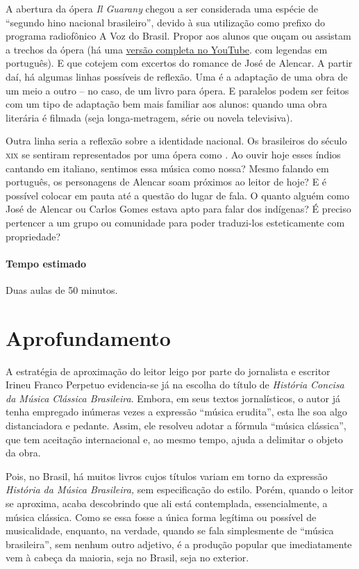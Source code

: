 \documentclass[11pt]{extarticle}
\begin{document}
A abertura da ópera \textit{Il Guarany} chegou a ser considerada uma espécie de
“segundo hino nacional brasileiro”, devido à sua utilização como prefixo do
programa radiofônico A Voz do Brasil. Propor aos alunos que ouçam ou assistam a
trechos da ópera  (há uma 
\href{https://www.youtube.com/watch?v=XTIpAyXyvFA&t=3746s}{versão completa no YouTube}. 
com legendas em
português).
E que cotejem
com excertos do romance de José de Alencar. A partir daí, há algumas linhas
possíveis de reflexão. Uma é a adaptação de uma obra de um meio a outro – no
caso, de um livro para ópera. E paralelos podem ser feitos com um tipo de
adaptação bem mais familiar aos alunos: quando uma obra literária é filmada
(seja longa-metragem, série ou novela televisiva). 

  Outra linha seria a reflexão sobre a identidade nacional. Os brasileiros do
século \textsc{xix} se sentiram representados por uma ópera como . Ao ouvir
hoje esses índios cantando em italiano, sentimos essa música como nossa? Mesmo
falando em português, os personagens de Alencar soam próximos ao leitor de
hoje? E é possível colocar em pauta até a questão do lugar de fala. O quanto
alguém como José de Alencar ou Carlos Gomes estava apto para falar dos
indígenas? É preciso pertencer a um grupo ou comunidade para poder traduzi-los
esteticamente com propriedade?

\paragraph{Tempo estimado} Duas aulas de 50 minutos.


\section{Aprofundamento}

A estratégia de aproximação do leitor leigo por parte do jornalista e
escritor Irineu Franco Perpetuo evidencia-se já na escolha do título de
\emph{História Concisa da Música Clássica Brasileira}. Embora, em seus
textos jornalísticos, o autor já tenha empregado inúmeras vezes a
expressão ``música erudita'', esta lhe soa algo distanciadora e pedante.
Assim, ele resolveu adotar a fórmula ``música clássica'', que tem
aceitação internacional e, ao mesmo tempo, ajuda a delimitar o objeto da
obra.

Pois, no Brasil, há muitos livros cujos títulos variam em torno da
expressão \emph{História da Música Brasileira,} sem especificação do
estilo. Porém, quando o leitor se aproxima, acaba descobrindo que ali
está contemplada, essencialmente, a música clássica. Como se essa fosse
a única forma legítima ou possível de musicalidade, enquanto, na
verdade, quando se fala simplesmente de ``música brasileira'', sem
nenhum outro adjetivo, é a produção popular que imediatamente vem à
cabeça da maioria, seja no Brasil, seja no exterior.
\end{document}
